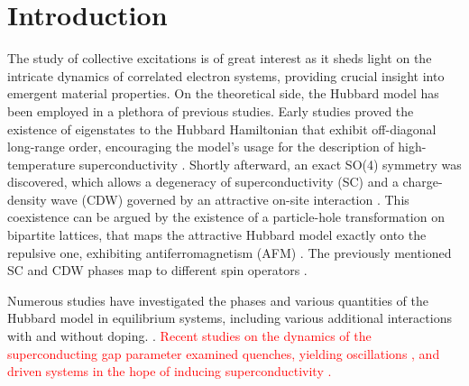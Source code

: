 \documentclass[
    reprint, 
    aps,
    preprintnumbers,
    twocolumn,
    prb,
    superscriptaddress
]{revtex4-2}
\begin{document}

\section{Introduction}\label{sec:introduction}


The study of collective excitations is of great interest as it sheds light on the intricate dynamics of correlated electron systems, providing crucial insight into emergent material properties.
On the theoretical side, the Hubbard model has been employed in a plethora of previous studies. 
Early studies proved the existence of eigenstates to the Hubbard Hamiltonian that exhibit off-diagonal long-range order,
encouraging the model's usage for the description of high-temperature superconductivity \cite{yang89}.
Shortly afterward, an exact SO(4) symmetry was discovered, which allows a degeneracy of superconductivity (SC) and a charge-density wave (CDW) governed by an attractive on-site interaction \cite{yang90}.
This coexistence can be argued by the existence of a particle-hole transformation on bipartite lattices, 
that maps the attractive Hubbard model exactly onto the repulsive one, exhibiting antiferromagnetism (AFM) \cite{Hirsch85}.
The previously mentioned SC and CDW phases map to different spin operators \cite{zitko15,lieb89}.

Numerous studies have investigated the phases and various quantities of the Hubbard model in equilibrium systems, including various additional interactions with and without doping.
\cite{Micnas88,Micnas88b,Micnas89,Dzierzawa92,Kostyrko92,Eriksson95,Staudt00,Onari04,Toschi05,Brackett16,Paki19,romer20,Sushchyev22}.
\textcolor{red}{Recent studies on the dynamics of the superconducting gap parameter examined quenches, yielding oscillations \cite{Volkov73,Yuzbashyan05,Yuzbashyan06,Barankov06,Cui19}, 
and driven systems in the hope of inducing superconductivity \cite{Nicoletti14,Krull14,Moor14,Casandruc15,patel16,sentef17,Buenemann17}.}
\end{document}
